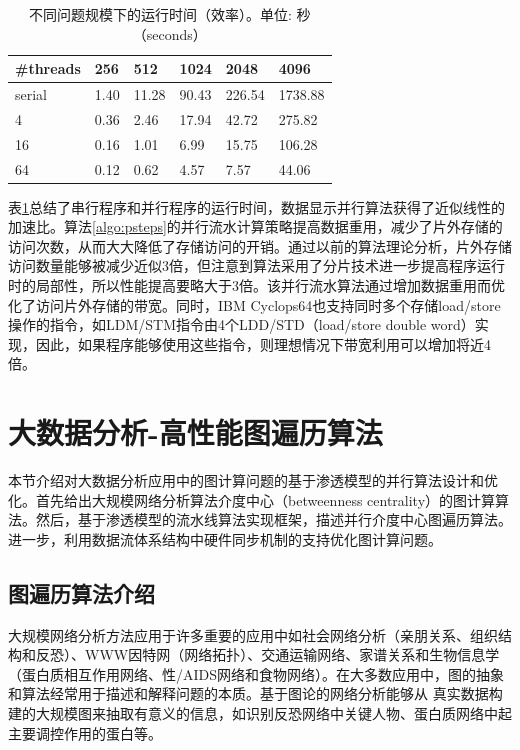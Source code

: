 \begin{flushleft}
\begin{table}
	\begin{center}
		\caption{不同问题规模下的运行时间（效率）。单位: 秒（seconds）} \label{tab:exe_time}
		\begin{tabular}{|l|l|l|l|l|l|}
			\hline
			\#threads & 256 & 512 & 1024 & 2048 & 4096 \\\hline
			serial & 1.40 & 11.28 & 90.43 & 226.54 & 1738.88\\\hline
			4 & 0.36 & 2.46 & 17.94 & 42.72 & 275.82\\\hline
			16 & 0.16 & 1.01 & 6.99 & 15.75 & 106.28\\\hline
			64 & 0.12 & 0.62 & 4.57 & 7.57 & 44.06\\\hline
		\end{tabular}
	\end{center}
\end{table}
表\ref{tab:exe_time}总结了串行程序和并行程序的运行时间，数据显示并行算法获得了近似线性的加速比。算法\ref{algo:psteps}的并行流水计算策略提高数据重用，减少了片外存储的访问次数，从而大大降低了存储访问的开销。通过以前的算法理论分析，片外存储访问数量能够被减少近似3倍，但注意到算法采用了分片技术进一步提高程序运行时的局部性，所以性能提高要略大于3倍。该并行流水算法通过增加数据重用而优化了访问片外存储的带宽。同时，IBM Cyclops64也支持同时多个存储load/store操作的指令，如LDM/STM指令由4个LDD/STD（load/store double word）实现，因此，如果程序能够使用这些指令，则理想情况下带宽利用可以增加将近4倍。




\section{大数据分析-高性能图遍历算法}\label{sec:PM_graph}

本节介绍对大数据分析应用中的图计算问题的基于渗透模型的并行算法设计和优化。首先给出大规模网络分析算法介度中心（betweenness centrality）的图计算算法。然后，基于渗透模型的流水线算法实现框架，描述并行介度中心图遍历算法。进一步，利用数据流体系结构中硬件同步机制的支持优化图计算问题。

\subsection{图遍历算法介绍}
大规模网络分析方法应用于许多重要的应用中如社会网络分析（亲朋关系、组织结构和反恐）、WWW因特网（网络拓扑）、交通运输网络、家谱关系和生物信息学
（蛋白质相互作用网络、性/AIDS网络和食物网络）\citep{network-app-social-Freeman,network-app-social-url,network-cs-acm,network-cs-connections,network-app-web,network-app-internet,network-app-bioinformatics,network-app-nature,network-app-recomb,network-app-aids}。在大多数应用中，图的抽象和算法经常用于描述和解释问题的本质\cite{network-app,network-app-sci}。基于图论的网络分析能够从
真实数据构建的大规模图来抽取有意义的信息，如识别反恐网络中关键人物、蛋白质网络中起主要调控作用的蛋白等。


\end{flushleft}
